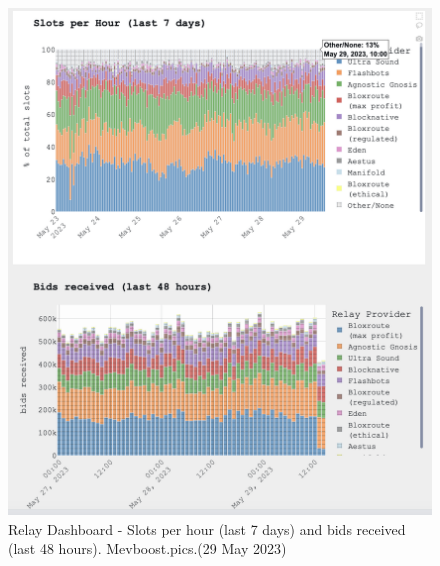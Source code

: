 \documentclass[UTF8]{article}
\begin{document}
{\begin{figure}[htbp]
\begin{center}
\includegraphics[width=0.9\linewidth]{images/mevrelay2}
\caption{Relay Dashboard - Slots per hour (last 7 days) and bids received (last 48 hours). Mevboost.pics.(29 May 2023)}
\label{fig:mevrelay2}
\end{center}
\end{figure}

}
\end{document}
